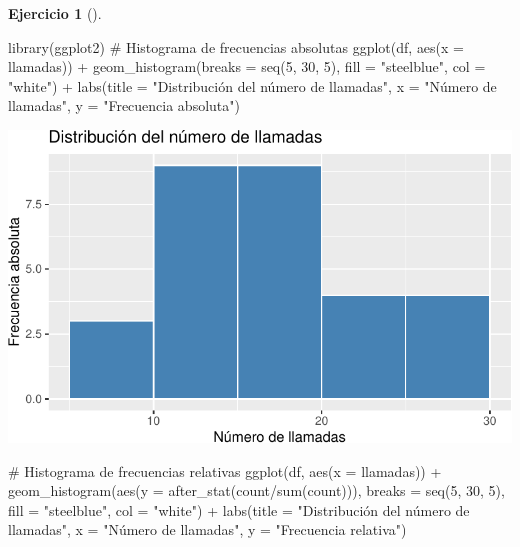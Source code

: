 \documentclass[
  a4paper,
]{scrreport}
\newenvironment{Shaded}{\begin{snugshade}}{\end{snugshade}}
\newcommand{\AttributeTok}[1]{\textcolor[rgb]{0.40,0.45,0.13}{#1}}
\newcommand{\CommentTok}[1]{\textcolor[rgb]{0.37,0.37,0.37}{#1}}
\newcommand{\DecValTok}[1]{\textcolor[rgb]{0.68,0.00,0.00}{#1}}
\newcommand{\FunctionTok}[1]{\textcolor[rgb]{0.28,0.35,0.67}{#1}}
\newcommand{\NormalTok}[1]{\textcolor[rgb]{0.00,0.23,0.31}{#1}}
\newcommand{\SpecialCharTok}[1]{\textcolor[rgb]{0.37,0.37,0.37}{#1}}
\newcommand{\StringTok}[1]{\textcolor[rgb]{0.13,0.47,0.30}{#1}}
\theoremstyle{definition}
\newtheorem{exercise}{Ejercicio}[chapter]
\theoremstyle{remark}
\begin{document}
\begin{exercise}[]
\begin{enumerate}
\begin{tcolorbox}
\begin{Shaded}
\begin{Highlighting}[]
\FunctionTok{library}\NormalTok{(ggplot2)}
\CommentTok{\# Histograma de frecuencias absolutas}
\FunctionTok{ggplot}\NormalTok{(df, }\FunctionTok{aes}\NormalTok{(}\AttributeTok{x =}\NormalTok{ llamadas)) }\SpecialCharTok{+}
    \FunctionTok{geom\_histogram}\NormalTok{(}\AttributeTok{breaks =} \FunctionTok{seq}\NormalTok{(}\DecValTok{5}\NormalTok{, }\DecValTok{30}\NormalTok{, }\DecValTok{5}\NormalTok{), }\AttributeTok{fill =} \StringTok{"steelblue"}\NormalTok{, }\AttributeTok{col =} \StringTok{"white"}\NormalTok{) }\SpecialCharTok{+} 
    \FunctionTok{labs}\NormalTok{(}\AttributeTok{title =} \StringTok{"Distribución del número de llamadas"}\NormalTok{, }\AttributeTok{x =} \StringTok{"Número de llamadas"}\NormalTok{, }\AttributeTok{y =} \StringTok{"Frecuencia absoluta"}\NormalTok{)}
\end{Highlighting}
\end{Shaded}

  \includegraphics{03-frecuencias-graficos_files/figure-pdf/unnamed-chunk-19-1.pdf}

\begin{Shaded}
\begin{Highlighting}[]
\CommentTok{\# Histograma de frecuencias relativas}
\FunctionTok{ggplot}\NormalTok{(df, }\FunctionTok{aes}\NormalTok{(}\AttributeTok{x =}\NormalTok{ llamadas)) }\SpecialCharTok{+}
    \FunctionTok{geom\_histogram}\NormalTok{(}\FunctionTok{aes}\NormalTok{(}\AttributeTok{y =} \FunctionTok{after\_stat}\NormalTok{(count}\SpecialCharTok{/}\FunctionTok{sum}\NormalTok{(count))), }\AttributeTok{breaks =} \FunctionTok{seq}\NormalTok{(}\DecValTok{5}\NormalTok{, }\DecValTok{30}\NormalTok{, }\DecValTok{5}\NormalTok{), }\AttributeTok{fill =} \StringTok{"steelblue"}\NormalTok{, }\AttributeTok{col =} \StringTok{"white"}\NormalTok{) }\SpecialCharTok{+}
    \FunctionTok{labs}\NormalTok{(}\AttributeTok{title =} \StringTok{"Distribución del número de llamadas"}\NormalTok{, }\AttributeTok{x =} \StringTok{"Número de llamadas"}\NormalTok{, }\AttributeTok{y =} \StringTok{"Frecuencia relativa"}\NormalTok{)}
\end{Highlighting}
\end{Shaded}


\end{tcolorbox}
\end{enumerate}
\end{exercise}
\end{document}
